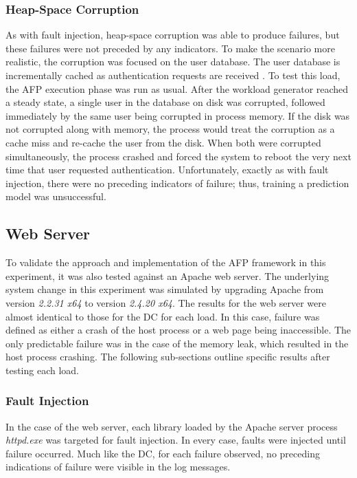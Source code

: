 \subsubsection{Heap-Space Corruption}
As with fault injection, heap-space corruption was able to produce failures,
but these failures were not preceded by any indicators.  To make the scenario
more realistic, the corruption was focused on the user database.  The user
database is incrementally cached as authentication requests are received
\citep{russinovich2009}.  To test this load, the \ac{AFP} execution phase was
run as usual.  After the workload generator reached a steady state, a single
user in the database on disk was corrupted, followed immediately by the same
user being corrupted in process memory.  If the disk was not corrupted along
with memory, the process would treat the corruption as a cache miss and
re-cache the user from the disk.  When both were corrupted simultaneously, the
process crashed and forced the system to reboot the very next time that user
requested authentication.  Unfortunately, exactly as with fault injection,
there were no preceding indicators of failure; thus, training a prediction
model was unsuccessful.

\subsection{Web Server}
To validate the approach and implementation of the \ac{AFP} framework in this
experiment, it was also tested against an Apache web server.  The underlying
system change in this experiment was simulated by upgrading Apache from version
\emph{2.2.31 x64} to version \emph{2.4.20 x64}.  The results for the web server
were almost identical to those for the \ac{DC} for each load.  In this case,
failure was defined as either a crash of the host process or a web page being
inaccessible.  The only predictable failure was in the case of the memory leak,
which resulted in the host process crashing.  The following sub-sections
outline specific results after testing each load.

\subsubsection{Fault Injection}
In the case of the web server, each library loaded by the Apache server process
\emph{httpd.exe} was targeted for fault injection.  In every case, faults were
injected until failure occurred.  Much like the \ac{DC}, for each failure
observed, no preceding indications of failure were visible in the log messages.

